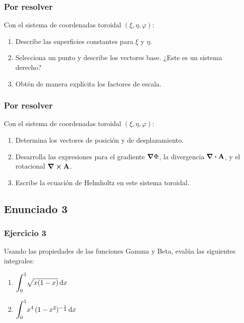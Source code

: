 \documentclass[12pt]{beamer}
\begin{document}
\begin{frame}
\frametitle{Por resolver}
Con el sistema de coordenadas toroidal $(\xi, \eta, \varphi)$:
\begin{enumerate}[<+->]
\item Describe las superficies constantes para $\xi$ y $\eta$.
\item Selecciona un punto y describe los vectores base. ¿Este es un sistema derecho?
\item Obtén de manera explícita los factores de escala.
\seti
\end{enumerate}
\end{frame}
\begin{frame}
\frametitle{Por resolver}
Con el sistema de coordenadas toroidal $(\xi, \eta, \varphi)$:
\begin{enumerate}[<+->]
\conti
\item Determina los vectores de posición y de desplazamiento.
\item Desarrolla las expresiones para el gradiente $\grad{\Phi}$, la divergencia \hfill \break $\divergence{\vb{A}}$, y el rotacional $\curl{\vb{A}}$.
\item Escribe la ecuación de Helmholtz en este sistema toroidal.
\end{enumerate}
\end{frame}

\subsection{Enunciado 3}

\begin{frame}
\frametitle{Ejercicio 3}
Usando las propiedades de las funciones Gamma y Beta, evalúa las siguientes integrales:
\begin{enumerate}[<+->]
\item $\scaleint{6ex}_{\bs 0}^{1} \sqrt{x (1 - x)} \dd{x}$
\item $\scaleint{6ex}_{\bs 0}^{1} x^{4} \, (1 - x^{2})^{-\frac{1}{2}} \dd{x}$
\end{enumerate}
\end{frame}
\end{document}
